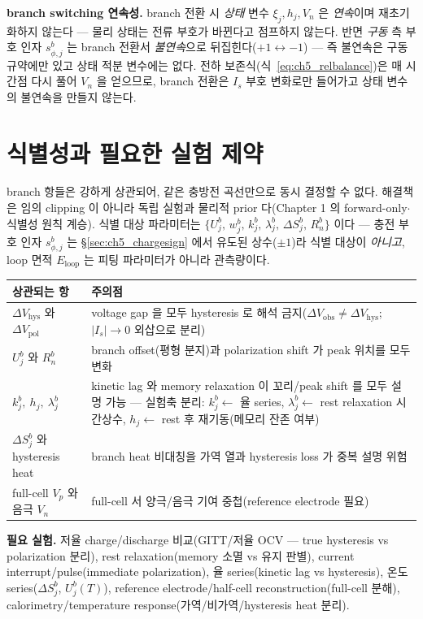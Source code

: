 \documentclass[11pt,a4paper]{article}
\newcommand{\hys}{\mathrm{hys}}
\newcommand{\pol}{\mathrm{pol}}
\newcommand{\obs}{\mathrm{obs}}
\begin{document}
\textbf{branch switching 연속성.} branch 전환 시 \emph{상태} 변수 $\xi_j,h_j,V_n$ 은 \emph{연속}이며 재초기화하지
않는다 — 물리 상태는 전류 부호가 바뀐다고 점프하지 않는다. 반면 \emph{구동} 측 부호 인자 $s_{\phi,j}^b$ 는 branch
전환서 \emph{불연속}으로 뒤집힌다($+1\leftrightarrow-1$) — 즉 불연속은 구동 규약에만 있고 상태 적분 변수에는 없다.
전하 보존식(식~\eqref{eq:ch5_relbalance})은 매 시간점 다시 풀어 $V_n$ 을 얻으므로, branch 전환은 $I_s$ 부호
변화로만 들어가고 상태 변수의 불연속을 만들지 않는다.

\section{식별성과 필요한 실험 제약}\label{sec:ch5_ident}
branch 항들은 강하게 상관되어, 같은 충방전 곡선만으로 동시 결정할 수 없다. 해결책은 임의 clipping 이 아니라 독립
실험과 물리적 prior 다(Chapter 1 의 forward-only$\cdot$식별성 원칙 계승). 식별 대상 파라미터는
$\{U_j^b,\,w_j^b,\,k_j^b,\,\lambda_j^b,\,\Delta S_j^b,\,R_n^b\}$ 이다 — 충전 부호 인자 $s_{\phi,j}^b$ 는
\S\ref{sec:ch5_chargesign} 에서 유도된 상수($\pm1$)라 식별 대상이 \emph{아니고}, loop 면적 $E_{\mathrm{loop}}$ 는
피팅 파라미터가 아니라 관측량이다.
\begin{longtable}{p{} >{\raggedright\arraybackslash}p{}}
\toprule 상관되는 항 & 주의점 \\ \midrule \endhead
$\Delta V_\hys$ 와 $\Delta V_\pol$ & voltage gap 을 모두 hysteresis 로 해석 금지($\Delta V_\obs\ne\Delta V_\hys$; $|I_s|\to0$ 외삽으로 분리) \\
$U_j^b$ 와 $R_n^b$ & branch offset(평형 분지)과 polarization shift 가 peak 위치를 모두 변화 \\
$k_j^b,\ h_j,\ \lambda_j^b$ & kinetic lag 와 memory relaxation 이 꼬리/peak shift 를 모두 설명 가능 — 실험축 분리: $k_j^b\leftarrow$ 율 series, $\lambda_j^b\leftarrow$ rest relaxation 시간상수, $h_j\leftarrow$ rest 후 재기동(메모리 잔존 여부) \\
$\Delta S_j^b$ 와 hysteresis heat & branch heat 비대칭을 가역 열과 hysteresis loss 가 중복 설명 위험 \\
full-cell $V_p$ 와 음극 $V_n$ & full-cell 서 양극/음극 기여 중첩(reference electrode 필요) \\
\bottomrule
\end{longtable}
\textbf{필요 실험.} 저율 charge/discharge 비교(GITT/저율 OCV — true hysteresis vs polarization 분리), rest
relaxation(memory 소멸 vs 유지 판별), current interrupt/pulse(immediate polarization), 율 series(kinetic lag
vs hysteresis), 온도 series($\Delta S_j^b$, $U_j^b(T)$), reference electrode/half-cell reconstruction(full-cell
분해), calorimetry/temperature response(가역/비가역/hysteresis heat 분리).
\end{document}
